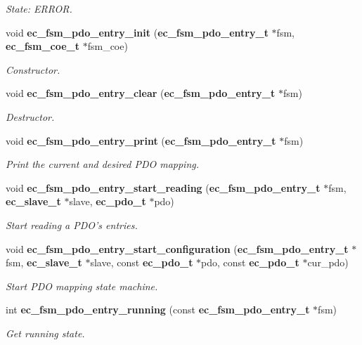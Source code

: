 \begin{DoxyCompactItemize}
\begin{DoxyCompactList}\small\item\em State\-: E\-R\-R\-O\-R. \end{DoxyCompactList}\item 
void {\bf ec\-\_\-fsm\-\_\-pdo\-\_\-entry\-\_\-init} ({\bf ec\-\_\-fsm\-\_\-pdo\-\_\-entry\-\_\-t} $\ast$fsm, {\bf ec\-\_\-fsm\-\_\-coe\-\_\-t} $\ast$fsm\-\_\-coe)
\begin{DoxyCompactList}\small\item\em Constructor. \end{DoxyCompactList}\item 
void {\bf ec\-\_\-fsm\-\_\-pdo\-\_\-entry\-\_\-clear} ({\bf ec\-\_\-fsm\-\_\-pdo\-\_\-entry\-\_\-t} $\ast$fsm)
\begin{DoxyCompactList}\small\item\em Destructor. \end{DoxyCompactList}\item 
void {\bf ec\-\_\-fsm\-\_\-pdo\-\_\-entry\-\_\-print} ({\bf ec\-\_\-fsm\-\_\-pdo\-\_\-entry\-\_\-t} $\ast$fsm)
\begin{DoxyCompactList}\small\item\em Print the current and desired P\-D\-O mapping. \end{DoxyCompactList}\item 
void {\bf ec\-\_\-fsm\-\_\-pdo\-\_\-entry\-\_\-start\-\_\-reading} ({\bf ec\-\_\-fsm\-\_\-pdo\-\_\-entry\-\_\-t} $\ast$fsm, {\bf ec\-\_\-slave\-\_\-t} $\ast$slave, {\bf ec\-\_\-pdo\-\_\-t} $\ast$pdo)
\begin{DoxyCompactList}\small\item\em Start reading a P\-D\-O's entries. \end{DoxyCompactList}\item 
void {\bf ec\-\_\-fsm\-\_\-pdo\-\_\-entry\-\_\-start\-\_\-configuration} ({\bf ec\-\_\-fsm\-\_\-pdo\-\_\-entry\-\_\-t} $\ast$fsm, {\bf ec\-\_\-slave\-\_\-t} $\ast$slave, const {\bf ec\-\_\-pdo\-\_\-t} $\ast$pdo, const {\bf ec\-\_\-pdo\-\_\-t} $\ast$cur\-\_\-pdo)
\begin{DoxyCompactList}\small\item\em Start P\-D\-O mapping state machine. \end{DoxyCompactList}\item 
int {\bf ec\-\_\-fsm\-\_\-pdo\-\_\-entry\-\_\-running} (const {\bf ec\-\_\-fsm\-\_\-pdo\-\_\-entry\-\_\-t} $\ast$fsm)
\begin{DoxyCompactList}\small\item\em Get running state. \end{DoxyCompactList}\item 

\end{DoxyCompactItemize}
